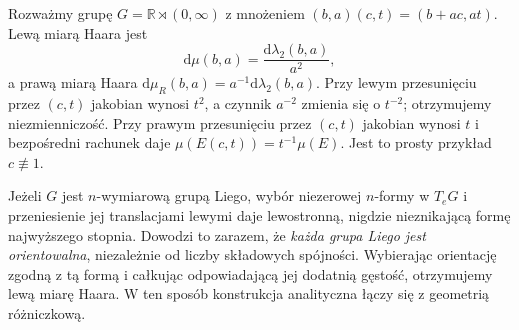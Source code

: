 \begin{przyklad}
\label{ex:haar-affine-23}
Rozważmy grupę $G=\mathbb R\rtimes(0,\infty)$
z mnożeniem
$(b,a)(c,t)=(b+ac,at)$. Lewą miarą Haara jest
\[
 \mathrm d\mu(b,a)=\frac{\mathrm d\lambda_2(b,a)}{a^2},
\]
a prawą miarą Haara
$\mathrm d\mu_R(b,a)=a^{-1}\mathrm d\lambda_2(b,a)$.
Przy lewym przesunięciu przez $(c,t)$ jakobian
wynosi $t^2$, a czynnik $a^{-2}$ zmienia się
o $t^{-2}$; otrzymujemy niezmienniczość.
Przy prawym przesunięciu przez $(c,t)$ jakobian
wynosi $t$ i bezpośredni rachunek daje
$\mu(E(c,t))=t^{-1}\mu(E)$.
Jest to prosty przykład $c\not\equiv1$.
\end{przyklad}

\begin{uwaga}
Jeżeli $G$ jest $n$-wymiarową grupą Liego, wybór
niezerowej $n$-formy w $T_eG$ i przeniesienie jej
translacjami lewymi daje lewostronną, nigdzie
nieznikającą formę najwyższego stopnia. Dowodzi to
zarazem, że \emph{każda grupa Liego jest orientowalna},
niezależnie od liczby składowych spójności. Wybierając
orientację zgodną z tą formą i całkując odpowiadającą
jej dodatnią gęstość, otrzymujemy lewą miarę Haara.
W ten sposób konstrukcja analityczna łączy się
z geometrią różniczkową.
\end{uwaga}